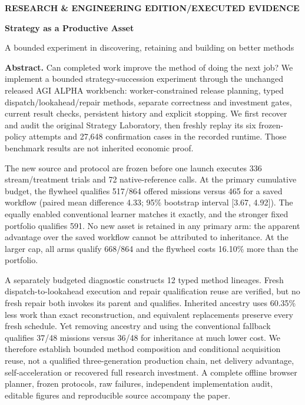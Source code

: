 {\sffamily\small\color{purple}\bfseries RESEARCH \& ENGINEERING EDITION\quad /\quad EXECUTED EVIDENCE}\par
\vspace{3mm}
{\sffamily\fontsize{25}{29}\selectfont\bfseries Strategy as a Productive Asset\par}
{\large A bounded experiment in discovering, retaining and building on better methods\par}
\vspace{3mm}
\textbf{Abstract.} Can completed work improve the method of doing the next job? We implement a bounded strategy-succession experiment through the unchanged released AGI ALPHA workbench: worker-constrained release planning, typed dispatch/lookahead/repair methods, separate correctness and investment gates, current result checks, persistent history and explicit stopping. We first recover and audit the original Strategy Laboratory, then freshly replay its six frozen-policy attempts and 27,648 confirmation cases in the recorded runtime. Those benchmark results are not inherited economic proof.

The new source and protocol are frozen before one launch executes 336 stream/treatment trials and 72 native-reference calls. At the primary cumulative budget, the flywheel qualifies 517/864 offered missions versus 465 for a saved workflow (paired mean difference 4.33; 95\% bootstrap interval [3.67, 4.92]). The equally enabled conventional learner matches it exactly, and the stronger fixed portfolio qualifies 591. No new asset is retained in any primary arm: the apparent advantage over the saved workflow cannot be attributed to inheritance. At the larger cap, all arms qualify 668/864 and the flywheel costs 16.10\% more than the portfolio.

A separately budgeted diagnostic constructs 12 typed method lineages. Fresh dispatch-to-lookahead execution and repair qualification reuse are verified, but no fresh repair both invokes its parent and qualifies. Inherited ancestry uses 60.35\% less work than exact reconstruction, and equivalent replacements preserve every fresh schedule. Yet removing ancestry and using the conventional fallback qualifies 37/48 missions versus 36/48 for inheritance at much lower cost. We therefore establish bounded method composition and conditional acquisition reuse, not a qualified three-generation production chain, net delivery advantage, self-acceleration or recovered full research investment. A complete offline browser planner, frozen protocols, raw failures, independent implementation audit, editable figures and reproducible source accompany the paper.

